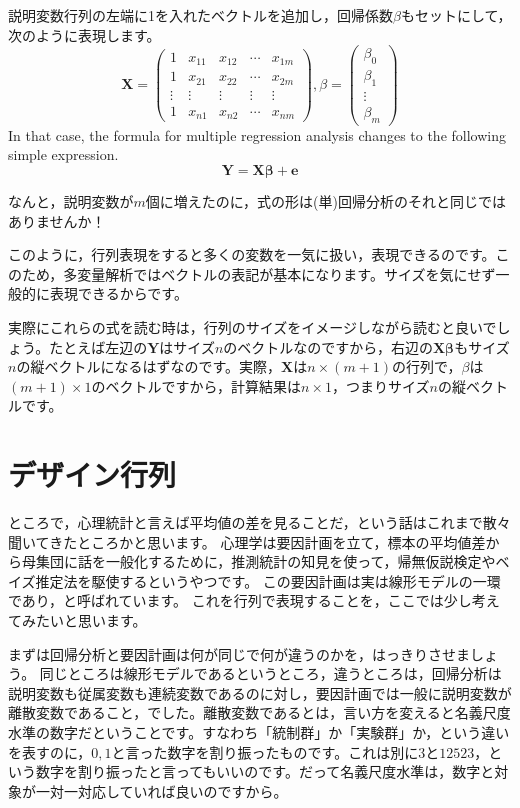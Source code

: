 \documentclass{ltjsbook}
\begin{document}
説明変数行列の左端に1を入れたベクトルを追加し，回帰係数$\beta$もセットにして，次のように表現します。
\[
	\bm{X} = \begin{pmatrix}
		1      & x_{11} & x_{12} & \cdots & x_{1m} \\
		1      & x_{21} & x_{22} & \cdots & x_{2m} \\
		\vdots & \vdots & \vdots & \vdots & \vdots \\
		1      & x_{n1} & x_{n2} & \cdots & x_{nm}
	\end{pmatrix},
	\beta=\begin{pmatrix}
		\beta_0 \\
		\beta_1 \\
		\vdots  \\
		\beta_m
	\end{pmatrix}
\]
In that case, the formula for multiple regression analysis changes to the following simple expression.
\[ \bm{Y} = \bm{X \beta} + \bm{e} \]

なんと，説明変数が$m$個に増えたのに，式の形は(単)回帰分析のそれと同じではありませんか！

このように，行列表現をすると多くの変数を一気に扱い，表現できるのです。このため，多変量解析ではベクトルの表記が基本になります。サイズを気にせず一般的に表現できるからです。

実際にこれらの式を読む時は，行列のサイズをイメージしながら読むと良いでしょう。たとえば左辺の$\bm{Y}$はサイズ$n$のベクトルなのですから，右辺の$\bm{X \beta}$もサイズ$n$の縦ベクトルになるはずなのです。実際，$\bm{X}$は$n \times (m+1)$の行列で，$\beta$は$(m+1) \times 1$のベクトルですから，計算結果は$n \times 1$，つまりサイズ$n$の縦ベクトルです。

\section{デザイン行列}
ところで，心理統計と言えば平均値の差を見ることだ，という話はこれまで散々聞いてきたところかと思います。
心理学は要因計画を立て，標本の平均値差から母集団に話を一般化するために，推測統計の知見を使って，帰無仮説検定やベイズ推定法を駆使するというやつです。
この要因計画は実は線形モデルの一環であり，と呼ばれています。
これを行列で表現することを，ここでは少し考えてみたいと思います。

まずは回帰分析と要因計画は何が同じで何が違うのかを，はっきりさせましょう。
同じところは線形モデルであるというところ，違うところは，回帰分析は説明変数も従属変数も連続変数であるのに対し，要因計画では一般に説明変数が離散変数であること，でした。離散変数であるとは，言い方を変えると名義尺度水準の数字だということです。すなわち「統制群」か「実験群」か，という違いを表すのに，$0,1$と言った数字を割り振ったものです。これは別に$3$と$12523$，という数字を割り振ったと言ってもいいのです。だって名義尺度水準は，数字と対象が一対一対応していれば良いのですから。
\end{document}
